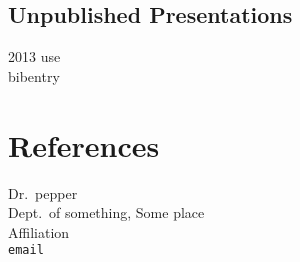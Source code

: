 \documentclass{cvjoe}
\begin{document}
\subsection{Unpublished Presentations}

\begin{cvlist}
    \item[2013] use \\bibentry %
\end{cvlist}

\section{References}

\begin{cvlist}
    \item[]
        Dr.\ pepper \\
        Dept.\ of something, Some place \\
        Affiliation \\
        {\tt email}
\end{cvlist}
\end{document}
